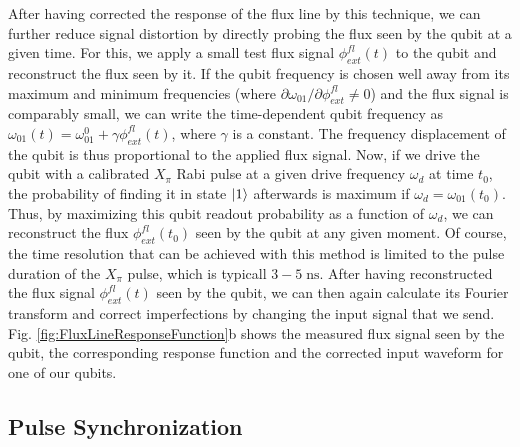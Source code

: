 After having corrected the response of the flux line by this technique, we can further reduce signal distortion by directly probing the flux seen by the qubit at a given time. For this, we apply a small test flux signal $\phi_{ext}^{fl}(t)$ to the qubit and reconstruct the flux seen by it. If the qubit frequency is chosen well away from its maximum and minimum frequencies (where $\partial \omega_{01}/\partial \phi_{ext}^{fl} \ne 0$) and the flux signal is comparably small, we can write the time-dependent qubit frequency as $\omega_{01}(t)=\omega_{01}^0+\gamma \phi_{ext}^{fl}(t)$, where $\gamma$ is a constant. The frequency displacement of the qubit is thus proportional to the applied flux signal. Now, if we drive the qubit with a calibrated $X_\pi$ Rabi pulse at a given drive frequency $\omega_{d}$ at time $t_0$, the probability of finding it in state $\left| 1 \right>$ afterwards is maximum if $\omega_{d}=\omega_{01}(t_0)$. Thus, by maximizing this qubit readout probability as a function of $\omega_{d}$, we can reconstruct the flux $\phi_{ext}^{fl}(t_0)$ seen by the qubit at any given moment. Of course, the time resolution that can be achieved with this method is limited to the pulse duration of the $X_\pi$ pulse, which is typicall $3-5\;\mathrm{ns}$. After having reconstructed the flux signal $\phi_{ext}^{fl}(t)$ seen by the qubit, we can then again calculate its Fourier transform and correct imperfections by changing the input signal that we send. Fig. \ref{fig:FluxLineResponseFunction}b shows the measured flux signal seen by the qubit, the corresponding response function and the corrected input waveform for one of our qubits.

\subsection{Pulse Synchronization}

